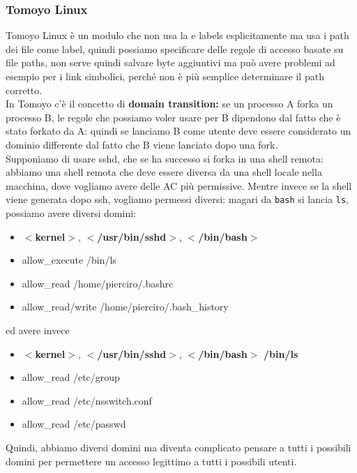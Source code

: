 \documentclass[12pt, oneside]{extbook} %
\begin{document}
\subsubsection{Tomoyo Linux}
Tomoyo Linux è un modulo che non usa la e labels esplicitamente ma usa i path dei file come label, quindi possiamo specificare delle regole di accesso basate su file paths, non serve quindi salvare byte aggiuntivi  ma può avere problemi ad esempio per i link simbolici, perché non è più semplice determinare il path corretto.\\In Tomoyo c'è il concetto di \textbf{domain transition:} se un processo A forka un processo B, le regole che possiamo voler usare per B dipendono dal fatto che è stato forkato da A: quindi se lanciamo B come utente deve essere considerato un dominio differente dal fatto che B viene lanciato dopo una fork.\\ Supponiamo di usare sshd, che se ha successo si forka in una shell remota: abbiamo una shell remota che deve essere diversa da una shell locale nella macchina, dove vogliamo avere delle AC più permissive. Mentre invece se la shell viene generata dopo ssh, vogliamo permessi diversi: magari da \texttt{bash} si lancia \texttt{ls}, possiamo avere diversi domini:
\begin{itemize}
\item \textbf{$<$kernel$>$}, \textbf{$<$/usr/bin/sshd$>$}, \textbf{$<$/bin/bash$>$}
\item allow\_execute /bin/ls
\item allow\_read /home/pierciro/.bashrc
\item allow\_read/write /home/pierciro/.bash\_history
\end{itemize}
ed avere invece 
\begin{itemize}
	\item \textbf{$<$kernel$>$}, \textbf{$<$/usr/bin/sshd$>$}, \textbf{$<$/bin/bash$>$} \textbf{/bin/ls}
	\item allow\_read /etc/group
	\item allow\_read /etc/nsswitch.conf
	\item allow\_read /etc/passwd
\end{itemize}
Quindi, abbiamo diversi domini ma diventa complicato pensare a tutti i possibili domini per permettere un accesso legittimo a tutti i possibili utenti.
\end{document}
